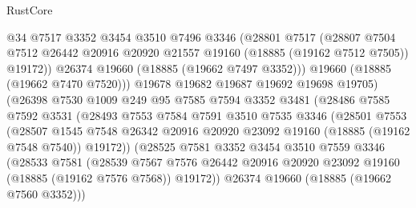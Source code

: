 \begin{lexlean}{RustCore}
\begin{coremodule}
                      @34
                      @7517
                      @3352
                      @3454
                      @3510
                      @7496
                      @3346
                      (@28801
                        @7517
                        (@28807
                          @7504
                          @7512
                          @26442
                          @20916
                          @20920
                          @21557
                          @19160
                          (@18885 (@19162 @7512 @7505))
                          @19172))
                      @26374
                      @19660
                      (@18885 (@19662 @7497 @3352)))
                    @19660
                    (@18885 (@19662 @7470 @7520)))
                  @19678
                  @19682
                  @19687
                  @19692
                  @19698
                  @19705)
                (@26398
                  @7530
                  @1009
                  @249
                  @95
                  @7585
                  @7594
                  @3352
                  @3481
                  (@28486
                    @7585
                    @7592
                    @3531
                    (@28493
                      @7553
                      @7584
                      @7591
                      @3510
                      @7535
                      @3346
                      (@28501
                        @7553
                        (@28507
                          @1545
                          @7548
                          @26342
                          @20916
                          @20920
                          @23092
                          @19160
                          (@18885 (@19162 @7548 @7540))
                          @19172))
                      (@28525
                        @7581
                        @3352
                        @3454
                        @3510
                        @7559
                        @3346
                        (@28533
                          @7581
                          (@28539
                            @7567
                            @7576
                            @26442
                            @20916
                            @20920
                            @23092
                            @19160
                            (@18885 (@19162 @7576 @7568))
                            @19172))
                        @26374
                        @19660
                        (@18885 (@19662 @7560 @3352)))

\end{coremodule}
\end{lexlean}
